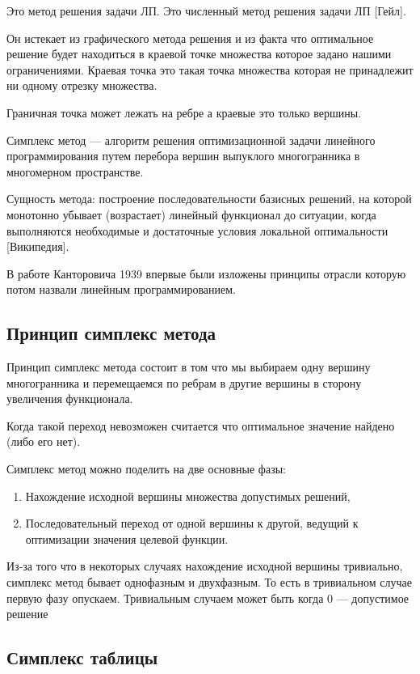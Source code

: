 \documentclass[a4paper,article,14pt]{extarticle}
\begin{document}
Это метод решения задачи ЛП.
Это численный метод решения задачи ЛП [Гейл].

Он истекает из графического метода решения и из факта что оптимальное решение будет находиться в краевой точке множества которое задано нашими ограничениями.
Краевая точка это такая точка множества которая не принадлежит ни одному отрезку множества.

Граничная точка может лежать на ребре а краевые это только вершины.

Симплекс метод --- алгоритм решения оптимизационной задачи линейного программирования путем перебора вершин выпуклого многогранника в многомерном пространстве.

Сущность метода: построение последовательности базисных решений, на которой монотонно убывает (возрастает) линейный функционал до ситуации, когда выполняются необходимые и достаточные условия локальной оптимальности [Википедия].

В работе Канторовича 1939 впервые были изложены принципы отрасли которую потом назвали линейным программированием.

\subsection{Принцип симплекс метода}

Принцип симплекс метода состоит в том что мы выбираем одну вершину многогранника и перемещаемся по ребрам в другие вершины в сторону увеличения функционала.

Когда такой переход невозможен считается что оптимальное значение найдено (либо его нет).

Симплекс метод можно поделить на две основные фазы:

\begin{enumerate}
    \item Нахождение исходной вершины множества допустимых решений,
    \item Последовательный переход от одной вершины к другой, ведущий к оптимизации значения целевой функции.
\end{enumerate}

Из-за того что в некоторых случаях нахождение исходной вершины тривиально, симплекс метод бывает однофазным и двухфазным.
То есть в тривиальном случае первую фазу опускаем.
Тривиальным случаем может быть когда 0 --- допустимое решение

\subsection{Симплекс таблицы}
\end{document}
